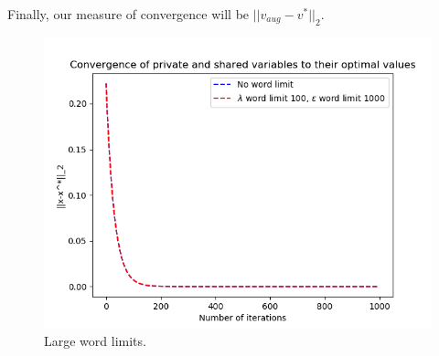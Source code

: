 \documentclass[12pt]{article}
\begin{document}
Finally, our measure of convergence will be $||v_{aug}-v^*||_2$.

\begin{figure}[H]
	\centering
	\includegraphics[scale=0.5]{Problem4-Convergence1.png}
	\caption{Large word limits.}
\end{figure}
\end{document}
